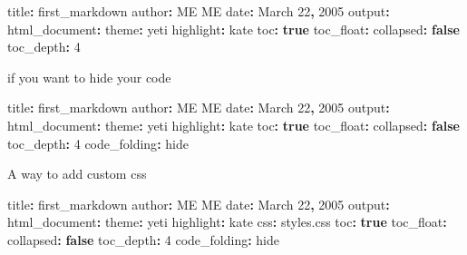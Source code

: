 \documentclass[
]{book}
\newenvironment{Shaded}{\begin{snugshade}}{\end{snugshade}}
\newcommand{\AttributeTok}[1]{\textcolor[rgb]{0.77,0.63,0.00}{#1}}
\newcommand{\DecValTok}[1]{\textcolor[rgb]{0.00,0.00,0.81}{#1}}
\newcommand{\KeywordTok}[1]{\textcolor[rgb]{0.13,0.29,0.53}{\textbf{#1}}}
\newcommand{\NormalTok}[1]{#1}
\newcommand{\OperatorTok}[1]{\textcolor[rgb]{0.81,0.36,0.00}{\textbf{#1}}}
\newcommand{\VariableTok}[1]{\textcolor[rgb]{0.00,0.00,0.00}{#1}}
\begin{document}
\begin{Shaded}
\begin{Highlighting}[]

\NormalTok{title}\OperatorTok{:}\NormalTok{ first_markdown}
\NormalTok{author}\OperatorTok{:}\NormalTok{ ME ME}
\NormalTok{date}\OperatorTok{:}\NormalTok{ March }\DecValTok{22}\OperatorTok{,} \DecValTok{2005}
\NormalTok{output}\OperatorTok{:} 
\NormalTok{  html_document}\OperatorTok{:}
\NormalTok{    theme}\OperatorTok{:}\NormalTok{ yeti}
\NormalTok{    highlight}\OperatorTok{:}\NormalTok{ kate}
\NormalTok{    toc}\OperatorTok{:} \KeywordTok{true}
\NormalTok{    toc_float}\OperatorTok{:} 
\NormalTok{      collapsed}\OperatorTok{:} \KeywordTok{false}
\NormalTok{    toc_depth}\OperatorTok{:} \DecValTok{4}
\end{Highlighting}
\end{Shaded}

if you want to hide your code

\begin{Shaded}
\begin{Highlighting}[]
\NormalTok{title}\OperatorTok{:}\NormalTok{ first_markdown}
\NormalTok{author}\OperatorTok{:}\NormalTok{ ME ME}
\NormalTok{date}\OperatorTok{:}\NormalTok{ March }\DecValTok{22}\OperatorTok{,} \DecValTok{2005}
\NormalTok{output}\OperatorTok{:} 
\NormalTok{  html_document}\OperatorTok{:}
\NormalTok{    theme}\OperatorTok{:}\NormalTok{ yeti}
\NormalTok{    highlight}\OperatorTok{:}\NormalTok{ kate}
\NormalTok{    toc}\OperatorTok{:} \KeywordTok{true}
\NormalTok{    toc_float}\OperatorTok{:} 
\NormalTok{      collapsed}\OperatorTok{:} \KeywordTok{false}
\NormalTok{    toc_depth}\OperatorTok{:} \DecValTok{4}
\NormalTok{    code_folding}\OperatorTok{:}\NormalTok{ hide}
\end{Highlighting}
\end{Shaded}

A way to add custom css

\begin{Shaded}
\begin{Highlighting}[]
\NormalTok{title}\OperatorTok{:}\NormalTok{ first_markdown}
\NormalTok{author}\OperatorTok{:}\NormalTok{ ME ME}
\NormalTok{date}\OperatorTok{:}\NormalTok{ March }\DecValTok{22}\OperatorTok{,} \DecValTok{2005}
\NormalTok{output}\OperatorTok{:} 
\NormalTok{  html_document}\OperatorTok{:}
\NormalTok{    theme}\OperatorTok{:}\NormalTok{ yeti}
\NormalTok{    highlight}\OperatorTok{:}\NormalTok{ kate}
\NormalTok{    css}\OperatorTok{:} \VariableTok{styles}\NormalTok{.}\AttributeTok{css}
\NormalTok{    toc}\OperatorTok{:} \KeywordTok{true}
\NormalTok{    toc_float}\OperatorTok{:} 
\NormalTok{      collapsed}\OperatorTok{:} \KeywordTok{false}
\NormalTok{    toc_depth}\OperatorTok{:} \DecValTok{4}
\NormalTok{    code_folding}\OperatorTok{:}\NormalTok{ hide}
\end{Highlighting}
\end{Shaded}
\end{document}
